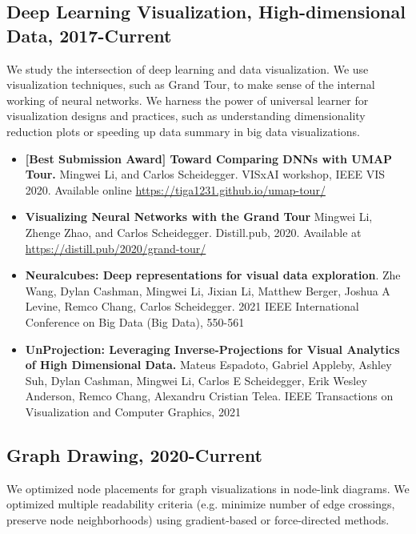 \documentclass[letterpaper,11pt,oneside]{article}
\begin{document}
\subsection*{Deep Learning Visualization, High-dimensional Data, 2017-Current}
We study the intersection of deep learning and data visualization. 
    We use visualization techniques, such as Grand Tour, to make sense of the internal working of neural networks. 
    We harness the power of universal learner for visualization designs and practices, such as understanding dimensionality reduction plots or speeding up data summary in big data visualizations.
    \begin{itemize}
        \item \textbf{[Best Submission Award] Toward Comparing DNNs with UMAP Tour. }
            Mingwei Li, and Carlos Scheidegger. 
            VISxAI workshop, IEEE VIS 2020. Available online \url{https://tiga1231.github.io/umap-tour/}
        \item \textbf{Visualizing Neural Networks with the Grand Tour}
            Mingwei Li, Zhenge Zhao, and Carlos Scheidegger.
            Distill.pub, 2020. Available at \url{https://distill.pub/2020/grand-tour/}
        \item \textbf{Neuralcubes: Deep representations for visual data exploration}. 
            Zhe Wang, Dylan Cashman, Mingwei Li, Jixian Li, Matthew Berger, Joshua A Levine, Remco Chang, Carlos Scheidegger. 
            2021 IEEE International Conference on Big Data (Big Data), 550-561
        \item \textbf{UnProjection: Leveraging Inverse-Projections for Visual Analytics of High Dimensional Data.}
            Mateus Espadoto, Gabriel Appleby, Ashley Suh, Dylan Cashman, Mingwei Li, Carlos E Scheidegger, Erik Wesley Anderson, Remco Chang, Alexandru Cristian Telea. 
            IEEE Transactions on Visualization and Computer Graphics, 2021
    \end{itemize}


\subsection*{Graph Drawing, 2020-Current}
We optimized node placements for graph visualizations in node-link diagrams. 
We optimized multiple readability criteria (e.g. minimize number of edge crossings, preserve node neighborhoods) using gradient-based or force-directed methods. 
\end{document}
